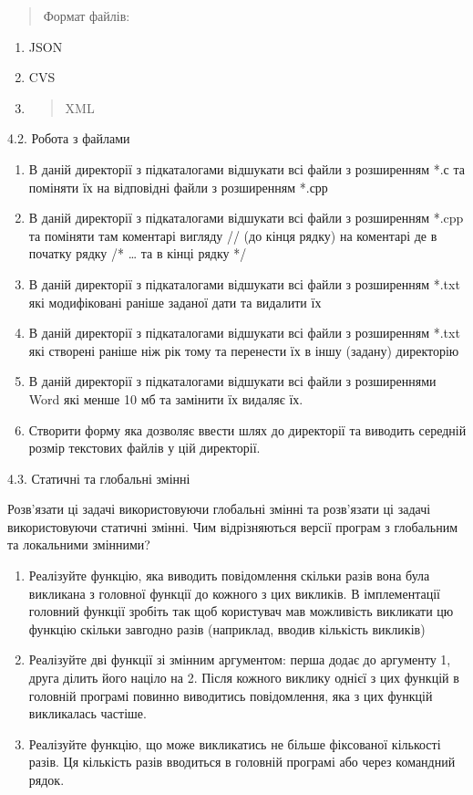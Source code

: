\documentclass[]{article}
\begin{document}
\begin{quote}
Формат файлів:
\end{quote}

\begin{enumerate}
\def\labelenumi{\alph{enumi})}
\item
  JSON
\item
  CVS
\item
  \begin{quote}
  XML
  \end{quote}
\end{enumerate}

4.2. Робота з файлами

\begin{enumerate}
\def\labelenumi{\arabic{enumi}.}
\item
  В даній директорії з підкаталогами відшукати всі файли з розширенням
  *.с та поміняти їх на відповідні файли з розширенням *.срр
\item
  В даній директорії з підкаталогами відшукати всі файли з розширенням
  *.cpp та поміняти там коментарі вигляду // (до кінця рядку) на
  коментарі де в початку рядку /* \ldots{} та в кінці рядку */
\item
  В даній директорії з підкаталогами відшукати всі файли з розширенням
  *.txt які модифіковані раніше заданої дати та видалити їх
\item
  В даній директорії з підкаталогами відшукати всі файли з розширенням
  *.txt які створені раніше ніж рік тому та перенести їх в іншу (задану)
  директорію
\item
  В даній директорії з підкаталогами відшукати всі файли з розширеннями
  Word які менше 10 мб та замінити їх видаляє їх.
\item
  Створити форму яка дозволяє ввести шлях до директорії та виводить
  середній розмір текстових файлів у цій директорії.
\end{enumerate}

4.3. Статичні та глобальні змінні

Розв'язати ці задачі використовуючи глобальні змінні та розв'язати ці
задачі використовуючи статичні змінні. Чим відрізняються версії програм
з глобальним та локальними змінними?

\begin{enumerate}
\def\labelenumi{\arabic{enumi})}
\item
  Реалізуйте функцію, яка виводить повідомлення скільки разів вона була
  викликана з головної функції до кожного з цих викликів. В
  імплементації головний функції зробіть так щоб користувач мав
  можливість викликати цю функцію скільки завгодно разів (наприклад,
  вводив кількість викликів)
\item
  Реалізуйте дві функції зі змінним аргументом: перша додає до аргументу
  1, друга ділить його націло на 2. Після кожного виклику однієї з цих
  функцій в головній програмі повинно виводитись повідомлення, яка з цих
  функцій викликалась частіше.
\item
  Реалізуйте функцію, що може викликатись не більше фіксованої кількості
  разів. Ця кількість разів вводиться в головній програмі або через
  командний рядок.
\end{enumerate}
\end{document}
